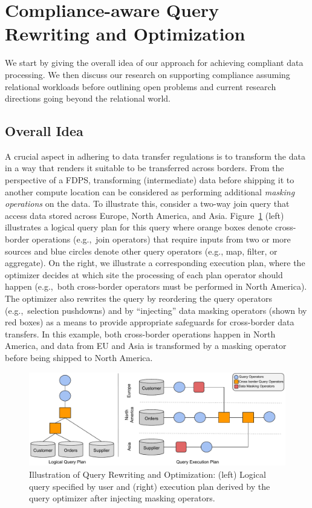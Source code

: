 \documentclass[11pt]{article}
\begin{document}
\section{Compliance-aware Query Rewriting and Optimization} %
\label{sec:compliance_aware_query_rewriting_and_optimization}

We start by giving the overall idea of our approach for
achieving compliant data processing. We then discuss our
research on supporting compliance assuming relational
workloads before outlining open problems and current
research directions going beyond the relational world.




\subsection{Overall Idea}

A crucial aspect in adhering to data transfer regulations is
to transform the data in a way that renders it suitable to
be transferred across borders. From the perspective of a
FDPS, transforming (intermediate) data before shipping it to
another compute location can be considered as performing
additional \emph{masking operations} on the data. To
illustrate this, consider a two-way join query that access
data stored across Europe, North America, and Asia.
Figure~\ref{fig:overview-qo} (left) illustrates a logical
query plan for this query where orange boxes denote
cross-border operations (e.g.,~join operators) that require
inputs from two or more sources and blue circles denote
other query operators (e.g., map, filter, or aggregate). On
the right, we illustrate a corresponding execution plan,
where the optimizer decides at which site the processing of
each plan operator should happen (e.g.,~both cross-border
operators must be performed in North America). The optimizer
also rewrites the query by reordering the query operators
(e.g.,~selection pushdowns) and by ``injecting'' data
masking operators (shown by red boxes) as a means to provide
appropriate safeguards for cross-border data transfers. In
this example, both cross-border operations happen in North
America, and data from EU and Asia is transformed by a
masking operator before being shipped to North America.




\begin{figure}
  \centering
  \includegraphics[scale=0.5]{figs/overview-query-optimization.pdf}
  \caption{Illustration of Query Rewriting and Optimization: (left) Logical query specified by user and (right) execution plan derived by the query optimizer after injecting masking operators.}
  \label{fig:overview-qo}
\end{figure}
\end{document}
